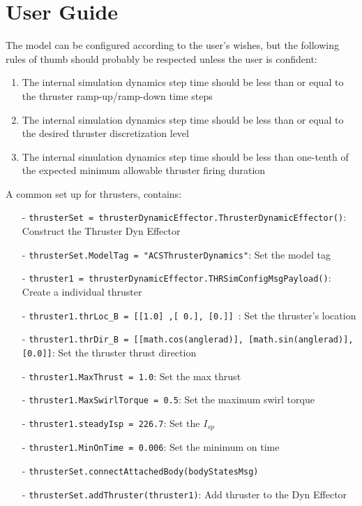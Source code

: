 \section{User Guide}

The model can be configured according to the user's wishes, but the following 
rules of thumb should probably be respected unless the user is confident:
\begin{enumerate}
\item{The internal simulation dynamics step time should be less than or equal 
     to the thruster ramp-up/ramp-down time steps}
\item{The internal simulation dynamics step time should be less than or equal to 
     the desired thruster discretization level}
\item{The internal simulation dynamics step time should be less than one-tenth 
    of the expected minimum allowable thruster firing duration}
\end{enumerate}

A common set up for thrusters, contains:

\begin{itemize}
  \item[-]      \texttt{thrusterSet = thrusterDynamicEffector.ThrusterDynamicEffector()}: Construct the Thruster Dyn Effector
  \item[-]   \texttt{thrusterSet.ModelTag = "ACSThrusterDynamics"}: Set the model tag
  \item[-]   \texttt{thruster1 = thrusterDynamicEffector.THRSimConfigMsgPayload()}: Create a individual thruster
  \item[-]   \texttt{thruster1.thrLoc\_B = [[1.0] ,[ 0.], [0.]] }: Set the thruster's location
  \item[-]   \texttt{thruster1.thrDir\_B = [[math.cos(anglerad)], [math.sin(anglerad)], [0.0]]}: Set the thruster thrust direction
  \item[-]   \texttt{thruster1.MaxThrust = 1.0}: Set the max thrust
  \item[-]   \texttt{thruster1.MaxSwirlTorque = 0.5}: Set the maximum swirl torque
  \item[-]   \texttt{thruster1.steadyIsp = 226.7}: Set the $I_{sp}$
  \item[-]   \texttt{thruster1.MinOnTime = 0.006}: Set the minimum on time
  \item[-]   \texttt{thrusterSet.connectAttachedBody(bodyStatesMsg)}
  \item[-]   \texttt{thrusterSet.addThruster(thruster1)}: Add thruster to the Dyn Effector
\end{itemize}


